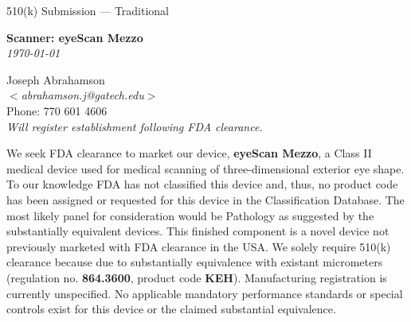 \newpage
{}
\singlespacing

\begin{flushright}
  \huge{510(k) Submission --- Traditional}\\[.5in]
  
  \begin{minipage}{0.8\textwidth}
    \begin{flushright}
      \large \textbf{Scanner: eyeScan Mezzo} \\
      \textit{\today}
    \end{flushright}
  \end{minipage}
\end{flushright}

\begin{flushleft}
  Joseph Abrahamson\\
  $<$\textit{abrahamson.j@gatech.edu}$>$ \\
  Phone: 770 601 4606 \\[1em]
  
  \textit{Will register establishment following FDA clearance.}
\end{flushleft}
\vspace{4em}

\onehalfspacing

We seek FDA clearance to market our device, \textbf{eyeScan Mezzo}, a
Class II medical device used for medical scanning of three-dimensional
exterior eye shape. To our knowledge FDA has not classified this
device and, thus, no product code has been assigned or requested for
this device in the Classification Database. The most likely panel for
consideration would be Pathology as suggested by the substantially
equivalent devices. This finished component is a novel device not
previously marketed with FDA clearance in the USA. We solely require
510(k) clearance because due to substantially equivalence with
existant micrometers (regulation no. \textbf{864.3600}, product code
\textbf{KEH}). Manufacturing registration is currently unspecified. No
applicable mandatory performance standards or special controls exist
for this device or the claimed substantial equivalence.


